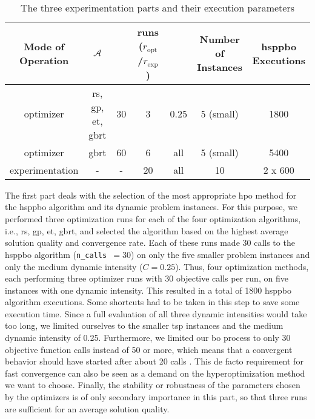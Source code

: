 \begin{table}[ht]
	 \caption{The three experimentation parts and their execution parameters}
	\label{tab:exp-setup}
	\centering
	\begin{adjustbox}{width=1\textwidth}
	\begin{tabular}{c|c|c|c|c|c|c}
		\thead{Mode of\\Operation} & \thead{HPO Method} $\mathcal{A}$ & \thead{n\_calls} & \thead{runs\\ ($r_\text{opt}$/$r_\text{exp}$)} & \thead{Dynamic Intensity $C$} & \thead{Number of\\Instances} & \thead{\gls{hsppbo}\\Executions} \\
		\hline
		optimizer & \makecell{\gls{rs}, \gls{gp},\\ \gls{et}, \gls{gbrt}} & 30 & 3 & 0.25 & 5 (small) & 1800 \\

		optimizer & \gls{gbrt} & 60 & 6 & all & 5 (small) & 5400 \\
		experimentation & - & - & 20 & all & 10  & 2 x 600 \\
	\end{tabular}
\end{adjustbox}
\end{table}

The first part deals with the selection of the most appropriate \gls{hpo} method for the \gls{hsppbo} algorithm and its dynamic problem instances. For this purpose, we performed three optimization runs for each of the four optimization algorithms, i.e., \gls{rs}, \gls{gp}, \gls{et}, \gls{gbrt}, and selected the algorithm based on the highest average solution quality and convergence rate. Each of these runs made 30 calls to the \gls{hsppbo} algorithm (\texttt{n\_calls }$= 30$) on only the five smaller problem instances and only the medium dynamic intensity ($C = 0.25$). Thus, four optimization methods, each performing three optimizer runs with 30 objective calls per run, on five instances with one dynamic intensity. This resulted in a total of 1800 \gls{hsppbo} algorithm executions. Some shortcuts had to be taken in this step to save some execution time. Since a full evaluation of all three dynamic intensities would take too long, we limited ourselves to the smaller \gls{tsp} instances and the medium dynamic intensity of 0.25. Furthermore, we limited our \gls{bo} process to only 30 objective function calls instead of 50 or more, which means that a convergent behavior should have started after about 20 calls \cite{head2016}. This de facto requirement for fast convergence can also be seen as a demand on the hyperoptimization method we want to choose. Finally, the stability or robustness of the parameters chosen by the optimizers is of only secondary importance in this part, so that three runs are sufficient for an average solution quality.

